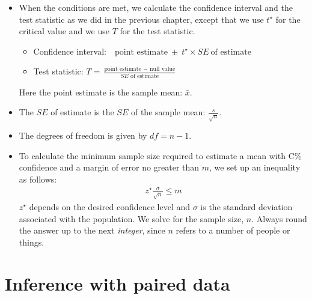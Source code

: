 \begin{itemize}
\item When the conditions are met, we calculate the confidence interval and the test statistic as we did in the previous chapter, except that we use $t^{\star}$ for the critical value and we use $T$ for the test statistic.

\begin{itemize}
\setlength{\itemsep}{2mm}
\item[] Confidence interval:\ \  $\text{point estimate}\ \pm\ t^{\star} \times SE\ \text{of estimate}$
\item[] Test statistic:  $T = \frac{\text{point estimate } - \text{ null value}}{SE \text{ of estimate}}$ 
\end{itemize}
Here the point estimate is the sample mean: $\bar{x}$.
\item[] The $SE$ of estimate is the $SE$ of the sample mean: $\frac{s}{\sqrt{n}}$.
\item[] The degrees of freedom is given by $df = n-1$.

\item To calculate the minimum sample size required to estimate a mean with C\% confidence and a margin of error no greater than $m$, we set up an inequality as follows: 
\begin{align*}
z^{\star}\frac{\sigma}{\sqrt{n}}\leq m
\end{align*}
$z^{\star}$ depends on the desired confidence level and $\sigma$ is the standard deviation associated with the population. We solve for the sample size, $n$.  Always round the answer up to the next \emph{integer}, since $n$ refers to a number of people or things. 

\end{itemize}


{}


\section[Inference with paired data]{Inference with paired data }

\label{pairedData}


